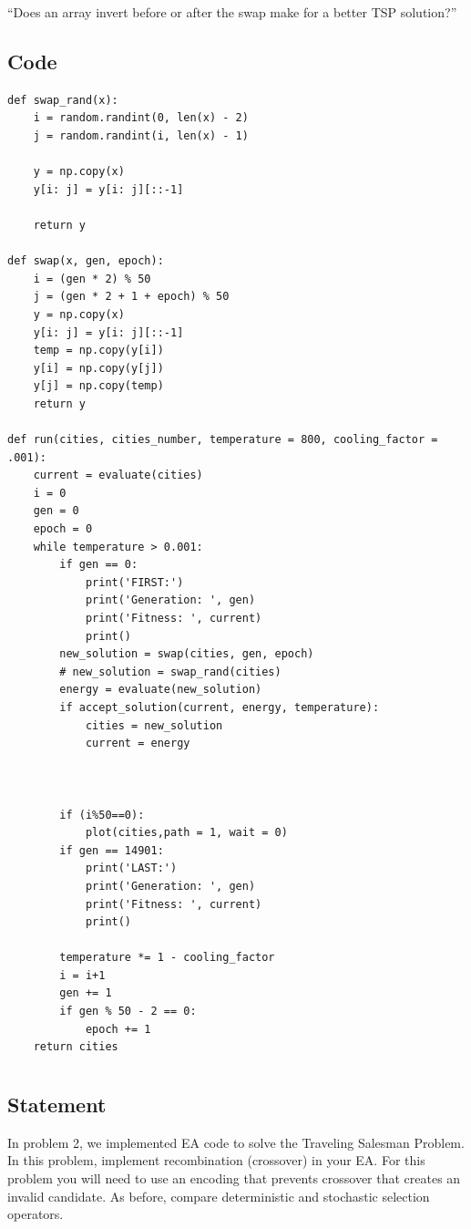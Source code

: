 \documentclass[12pt]{article}
\begin{document}
``Does an array invert before or after the swap make for a better TSP solution?''


\newpage
\subsection{Code}
\begin{lstlisting}
def swap_rand(x):
    i = random.randint(0, len(x) - 2)
    j = random.randint(i, len(x) - 1)

    y = np.copy(x)
    y[i: j] = y[i: j][::-1]

    return y

def swap(x, gen, epoch):
    i = (gen * 2) % 50
    j = (gen * 2 + 1 + epoch) % 50
    y = np.copy(x)
    y[i: j] = y[i: j][::-1]
    temp = np.copy(y[i])
    y[i] = np.copy(y[j])
    y[j] = np.copy(temp)
    return y

def run(cities, cities_number, temperature = 800, cooling_factor = .001):
    current = evaluate(cities)
    i = 0
    gen = 0
    epoch = 0
    while temperature > 0.001:
        if gen == 0:
            print('FIRST:')
            print('Generation: ', gen)
            print('Fitness: ', current)
            print()
        new_solution = swap(cities, gen, epoch)
        # new_solution = swap_rand(cities)
        energy = evaluate(new_solution)
        if accept_solution(current, energy, temperature):
            cities = new_solution
            current = energy

        

        if (i%50==0):
            plot(cities,path = 1, wait = 0)
        if gen == 14901:
            print('LAST:')
            print('Generation: ', gen)
            print('Fitness: ', current)
            print()

        temperature *= 1 - cooling_factor
        i = i+1
        gen += 1
        if gen % 50 - 2 == 0:
            epoch += 1
    return cities
\end{lstlisting}

\newpage
\section{} %

\subsection{Statement}
In problem 2, we implemented EA code to solve the Traveling Salesman Problem. 
In this problem, implement recombination (crossover) in your EA. For this 
problem you will need to use an encoding that prevents crossover that creates 
an invalid candidate. As before, compare deterministic and stochastic selection 
operators.
\end{document}
